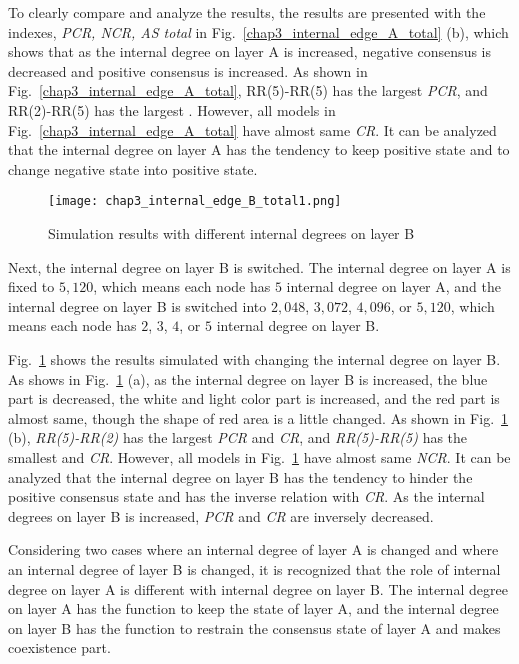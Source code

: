 To clearly compare and analyze the results, the results are presented with the indexes, \textit{PCR, NCR, AS total} in Fig.~\ref{chap3_internal_edge_A_total} (b), which shows that as the internal degree on layer A is increased, negative consensus is decreased and positive consensus is increased. As shown in Fig.~\ref{chap3_internal_edge_A_total}, RR(5)-RR(5) has the largest \textit{PCR}, and RR(2)-RR(5) has the largest . However, all models in Fig.~\ref{chap3_internal_edge_A_total} have almost same \textit{CR}. It can be analyzed that the internal degree on layer A has the tendency to keep positive state and to change negative state into positive state. 
\begin{figure}[!htb]
	\centering
	\texttt{[image: chap3\_internal\_edge\_B\_total1.png]}
	\caption{Simulation results with different internal degrees on layer B}
	\label{chap3_internal_edge_B_total}
\end{figure}
Next, the internal degree on layer B is switched. The internal degree on layer A is fixed to  $5,120$, which means each node has $5$ internal degree on layer A, and the internal degree on layer B is switched into $2,048$, $3,072$, $4,096$, or $5,120$, which means each node has $2$, $3$, $4$, or $5$ internal degree on layer B.  

Fig.~\ref{chap3_internal_edge_B_total} shows the results simulated with changing the internal degree on layer B. As shows in Fig.~\ref{chap3_internal_edge_B_total} (a), as the internal degree on layer B is increased, the blue part is decreased, the white and light color part is increased, and the red part is almost same, though the shape of red area is a little changed.  As shown in Fig.~\ref{chap3_internal_edge_B_total} (b), \textit{RR(5)-RR(2)} has the largest \textit{PCR} and \textit{CR}, and \textit{RR(5)-RR(5)} has the smallest  and \textit{CR}. However, all models in Fig.~\ref{chap3_internal_edge_B_total} have almost same \textit{NCR}. It can be analyzed that the internal degree on layer B has the tendency to hinder the positive consensus state and has the inverse relation with \textit{CR}. As the internal degrees on layer B is increased, \textit{PCR} and \textit{CR} are inversely decreased.

Considering two cases where an internal degree of layer A is changed and where an internal degree of layer B is changed, it is recognized that the role of internal degree on layer A is different with internal degree on layer B. The internal degree on layer A has the function to keep the state of layer A, and the internal degree on layer B has the function to restrain the consensus state of layer A and makes coexistence part. 

